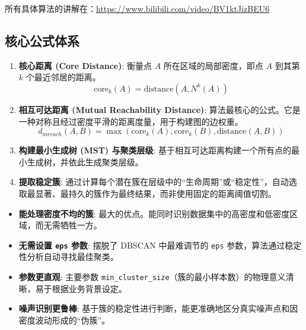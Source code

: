 \begin{tips}
    所有具体算法的讲解在：\href{https://www.bilibili.com/video/BV1ktJizBEU6}{https://www.bilibili.com/video/BV1ktJizBEU6}
\end{tips}

\begin{theorem}

    \section{核心公式体系}
    \begin{enumerate}[label=\arabic*., wide, labelindent=0pt]
        \item \textbf{核心距离 (Core Distance)}:
              衡量点 $A$ 所在区域的局部密度，即点 $A$ 到其第 $k$ 个最近邻居的距离。
              $$
                  \text{core}_k(A) = \text{distance}(A, N^k(A))
              $$
        \item \textbf{相互可达距离 (Mutual Reachability Distance)}:
              算法最核心的公式。它是一种对称且经过密度平滑的距离度量，用于构建图的边权重。
              $$
                  d_{mreach}(A, B) = \max(\text{core}_k(A), \text{core}_k(B), \text{distance}(A, B))
              $$
        \item \textbf{构建最小生成树 (MST) 与聚类层级}:
              基于相互可达距离构建一个所有点的最小生成树，并依此生成聚类层级。
        \item \textbf{提取稳定簇}:
              通过计算每个潜在簇在层级中的“生命周期”或“稳定性”，自动选取最显著、最持久的簇作为最终结果，而非使用固定的距离阈值切割。
    \end{enumerate}

    \begin{itemize}[leftmargin=*, label=\textbullet]
        \item \textbf{能处理密度不均的簇}:
              最大的优点。能同时识别数据集中的高密度和低密度区域，而无需牺牲一方。
        \item \textbf{无需设置 \texttt{eps} 参数}:
              摆脱了 DBSCAN 中最难调节的 \texttt{eps} 参数，算法通过稳定性分析自动寻找最佳聚类。
        \item \textbf{参数更直观}:
              主要参数 \texttt{min\_cluster\_size}（簇的最小样本数）的物理意义清晰，易于根据业务背景设定。
        \item \textbf{噪声识别更鲁棒}:
              基于簇的稳定性进行判断，能更准确地区分真实噪声点和因密度波动形成的“伪簇”。
    \end{itemize}


\end{theorem}

